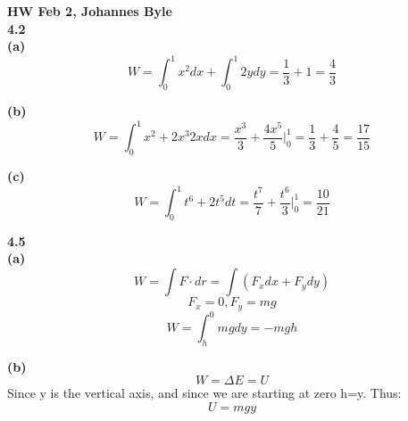 \documentclass[english]{article}
\begin{document}
\textbf{HW Feb 2, Johannes Byle}\\

\noindent
\textbf{4.2}\\
\textbf{(a)} $$W=\int_0^1 x^2dx+\int_0^1 2ydy=\frac{1}{3}+1=\frac{4}{3}$$

\noindent
\textbf{(b)} $$W=\int_0^1 x^2+2x^3 2xdx=\frac{x^3}{3}+\frac{4x^5}{5}\Big|_0^1=\frac{1}{3}+\frac{4}{5}=\frac{17}{15}$$

\noindent
\textbf{(c)} $$W=\int_0^1 t^6+2t^5dt=\frac{t^7}{7}+\frac{t^6}{3}\Big|_0^1=\frac{10}{21}$$

\noindent
\textbf{4.5}\\ 
\textbf{(a)} $$W=\int F\cdot dr=\int (F_xdx+F_ydy)$$
$$F_x=0,F_y=mg$$
$$W=\int_h^0 mgdy=-mgh$$

\noindent
\textbf{(b)} $$W=\Delta E=U$$
Since y is the vertical axis, and since we are starting at zero h=y. Thus:
$$U=mgy$$
\end{document}
